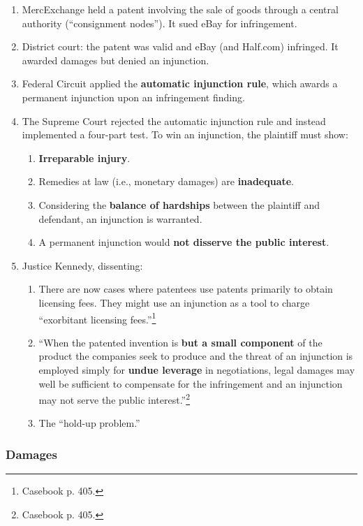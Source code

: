 \begin{enumerate}
    \item MercExchange held a patent involving the sale of goods through a 
    central authority (``consignment nodes''). It sued eBay for infringement.
    \item District court: the patent was valid and eBay (and Half.com) 
    infringed. It awarded damages but denied an injunction.
    \item Federal Circuit applied the \textbf{automatic injunction rule}, 
    which awards a permanent injunction upon an infringement finding.
    \item The Supreme Court rejected the automatic injunction rule and instead 
    implemented a four-part test. To win an injunction, the plaintiff must 
    show:
    \begin{enumerate}
        \item \textbf{Irreparable injury}.
        \item Remedies at law (i.e., monetary damages) are \textbf{inadequate}.
        \item Considering the \textbf{balance of hardships} between the 
        plaintiff and defendant, an injunction is warranted.
        \item A permanent injunction would \textbf{not disserve the public 
        interest}.
    \end{enumerate}
    \item Justice Kennedy, dissenting:
    \begin{enumerate}
        \item There are now cases where patentees use patents primarily to 
        obtain licensing fees. They might use an injunction as a tool to 
        charge ``exorbitant licensing fees.''\footnote{Casebook p. 405.}
        \item ``When the patented invention is \textbf{but a small component} 
        of the product the companies seek to produce and the threat of an 
        injunction is employed simply for \textbf{undue leverage} in 
        negotiations, legal damages may well be sufficient to compensate for 
        the infringement and an injunction may not serve the public 
        interest.''\footnote{Casebook p. 405.}
        \item The ``hold-up problem.''
    \end{enumerate}
\end{enumerate}

\subsubsection{Damages}

